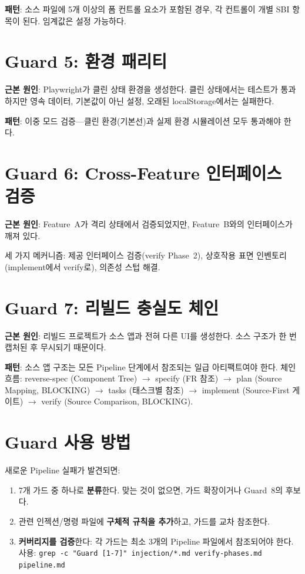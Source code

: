 \documentclass[11pt,a4paper,openright,twoside]{report}
\begin{document}
\textbf{패턴}: 소스 파일에 5개 이상의 폼 컨트롤 요소가 포함된 경우, 각 컨트롤이 개별 SBI 항목이 된다. 임계값은 설정 가능하다.

\section{Guard 5: 환경 패리티}

\textbf{근본 원인}: Playwright가 클린 상태 환경을 생성한다. 클린 상태에서는 테스트가 통과하지만 영속 데이터, 기본값이 아닌 설정, 오래된 localStorage에서는 실패한다.

\textbf{패턴}: 이중 모드 검증---클린 환경(기본선)과 실제 환경 시뮬레이션 모두 통과해야 한다.

\section{Guard 6: Cross-Feature 인터페이스 검증}

\textbf{근본 원인}: Feature~A가 격리 상태에서 검증되었지만, Feature~B와의 인터페이스가 깨져 있다.

세 가지 메커니즘: 제공 인터페이스 검증(verify Phase~2), 상호작용 표면 인벤토리(implement에서 verify로), 의존성 스텁 해결.

\section{Guard 7: 리빌드 충실도 체인}

\textbf{근본 원인}: 리빌드 프로젝트가 소스 앱과 전혀 다른 UI를 생성한다. 소스 구조가 한 번 캡처된 후 무시되기 때문이다.

\textbf{패턴}: 소스 앱 구조는 모든 Pipeline 단계에서 참조되는 일급 아티팩트여야 한다. 체인 흐름: reverse-spec (Component Tree) $\rightarrow$ specify (FR 참조) $\rightarrow$ plan (Source Mapping, BLOCKING) $\rightarrow$ tasks (태스크별 참조) $\rightarrow$ implement (Source-First 게이트) $\rightarrow$ verify (Source Comparison, BLOCKING).

\section{Guard 사용 방법}

새로운 Pipeline 실패가 발견되면:

\begin{enumerate}
  \item 7개 가드 중 하나로 \textbf{분류}한다. 맞는 것이 없으면, 가드 확장이거나 Guard~8의 후보다.
  \item 관련 인젝션/명령 파일에 \textbf{구체적 규칙을 추가}하고, 가드를 교차 참조한다.
  \item \textbf{커버리지를 검증}한다: 각 가드는 최소 3개의 Pipeline 파일에서 참조되어야 한다. 사용: \texttt{grep -c "Guard [1-7]" injection/*.md verify-phases.md pipeline.md}
\end{enumerate}
\end{document}
